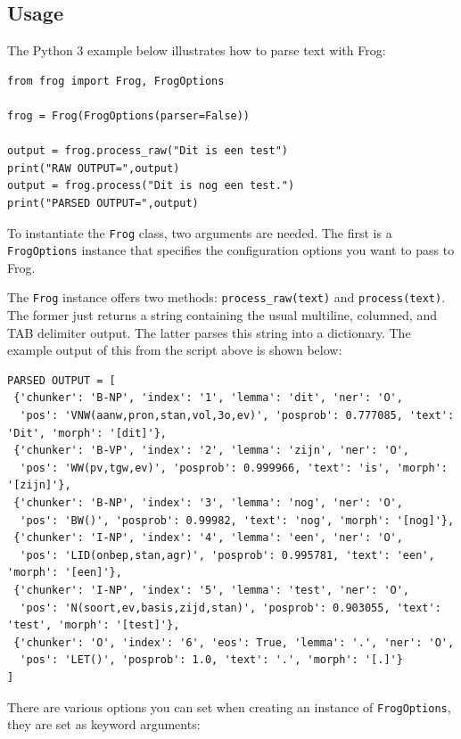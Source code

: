 \documentclass{book}
\begin{document}
\subsection{Usage}

The Python 3 example below illustrates how to parse text with Frog:

\begin{verbatim}
from frog import Frog, FrogOptions

frog = Frog(FrogOptions(parser=False))

output = frog.process_raw("Dit is een test")
print("RAW OUTPUT=",output)
output = frog.process("Dit is nog een test.")
print("PARSED OUTPUT=",output)
\end{verbatim}

To instantiate the \texttt{Frog} class, two arguments are needed. The first is a
\texttt{FrogOptions} instance that specifies the configuration options you want to
pass to Frog.

The \texttt{Frog} instance offers two methods: \texttt{process\_raw(text)} and
\texttt{process(text)}. The former just returns a string containing the usual
multiline, columned, and TAB delimiter output. The latter parses this string
into a dictionary. The example output of this from the script above is shown
below:

\begin{verbatim}
PARSED OUTPUT = [
 {'chunker': 'B-NP', 'index': '1', 'lemma': 'dit', 'ner': 'O',
  'pos': 'VNW(aanw,pron,stan,vol,3o,ev)', 'posprob': 0.777085, 'text': 'Dit', 'morph': '[dit]'},
 {'chunker': 'B-VP', 'index': '2', 'lemma': 'zijn', 'ner': 'O',
  'pos': 'WW(pv,tgw,ev)', 'posprob': 0.999966, 'text': 'is', 'morph': '[zijn]'},
 {'chunker': 'B-NP', 'index': '3', 'lemma': 'nog', 'ner': 'O',
  'pos': 'BW()', 'posprob': 0.99982, 'text': 'nog', 'morph': '[nog]'},
 {'chunker': 'I-NP', 'index': '4', 'lemma': 'een', 'ner': 'O',
  'pos': 'LID(onbep,stan,agr)', 'posprob': 0.995781, 'text': 'een', 'morph': '[een]'},
 {'chunker': 'I-NP', 'index': '5', 'lemma': 'test', 'ner': 'O',
  'pos': 'N(soort,ev,basis,zijd,stan)', 'posprob': 0.903055, 'text': 'test', 'morph': '[test]'},
 {'chunker': 'O', 'index': '6', 'eos': True, 'lemma': '.', 'ner': 'O',
  'pos': 'LET()', 'posprob': 1.0, 'text': '.', 'morph': '[.]'}
]
\end{verbatim}

There are various options you can set when creating an instance of \texttt{FrogOptions}, they are set as keyword arguments:
\end{document}
